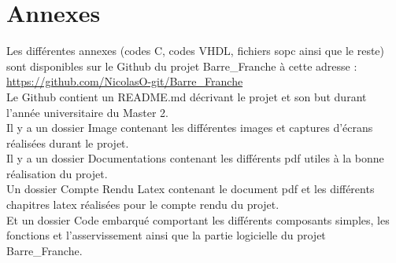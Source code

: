\section{Annexes}
Les différentes annexes (codes C, codes VHDL, fichiers sopc ainsi que le reste) sont disponibles sur le Github du projet Barre\_Franche à cette adresse :\\

\url{https://github.com/NicolasO-git/Barre\_Franche}\\\newline
Le Github contient un README.md décrivant le projet et son but durant l'année universitaire du Master 2.\\\newline
Il y a un dossier Image contenant les différentes images et captures d'écrans réalisées durant le projet.\\\newline
Il y a un dossier Documentations contenant les différents pdf utiles à la bonne réalisation du projet.\\\newline
Un dossier Compte Rendu Latex contenant le document pdf et les différents chapitres latex réalisées pour le compte rendu du projet.\\\newline 
Et un dossier Code embarqué comportant les différents composants simples, les fonctions et l'asservissement ainsi que la partie logicielle du projet Barre\_Franche. 